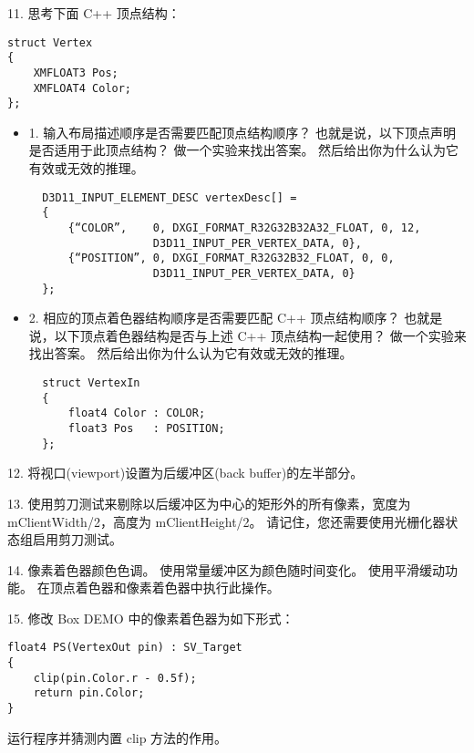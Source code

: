 \begin{flushleft}
11. 思考下面 C++ 顶点结构：
\end{flushleft}
\begin{lstlisting}
struct Vertex
{
    XMFLOAT3 Pos;
    XMFLOAT4 Color;
};
\end{lstlisting}
\begin{itemize}
  \item 1. 输入布局描述顺序是否需要匹配顶点结构顺序？ 也就是说，以下顶点声明是否适用于此顶点结构？ 做一个实验来找出答案。 然后给出你为什么认为它有效或无效的推理。
  \begin{lstlisting}
  D3D11_INPUT_ELEMENT_DESC vertexDesc[] =
  {
      {“COLOR”,    0, DXGI_FORMAT_R32G32B32A32_FLOAT, 0, 12,
                   D3D11_INPUT_PER_VERTEX_DATA, 0},
      {“POSITION”, 0, DXGI_FORMAT_R32G32B32_FLOAT, 0, 0,
                   D3D11_INPUT_PER_VERTEX_DATA, 0}
  };
  \end{lstlisting}
  \item 2. 相应的顶点着色器结构顺序是否需要匹配 C++ 顶点结构顺序？ 也就是说，以下顶点着色器结构是否与上述 C++ 顶点结构一起使用？ 做一个实验来找出答案。 然后给出你为什么认为它有效或无效的推理。
  \begin{lstlisting}
  struct VertexIn
  {
      float4 Color : COLOR;
      float3 Pos   : POSITION;
  };
  \end{lstlisting}
\end{itemize}

\begin{flushleft}
12. 将视口(viewport)设置为后缓冲区(back buffer)的左半部分。
\end{flushleft}

\begin{flushleft}
13. 使用剪刀测试来剔除以后缓冲区为中心的矩形外的所有像素，宽度为mClientWidth/2，高度为 mClientHeight/2。 请记住，您还需要使用光栅化器状态组启用剪刀测试。
\end{flushleft}

\begin{flushleft}
14. 像素着色器颜色色调。 使用常量缓冲区为颜色随时间变化。 使用平滑缓动功能。 在顶点着色器和像素着色器中执行此操作。
\end{flushleft}

\begin{flushleft}
15. 修改 Box DEMO 中的像素着色器为如下形式：
\end{flushleft}
\begin{lstlisting}
float4 PS(VertexOut pin) : SV_Target
{
    clip(pin.Color.r - 0.5f);
    return pin.Color;
}
\end{lstlisting}
\begin{flushleft}
运行程序并猜测内置 clip 方法的作用。
\end{flushleft}

